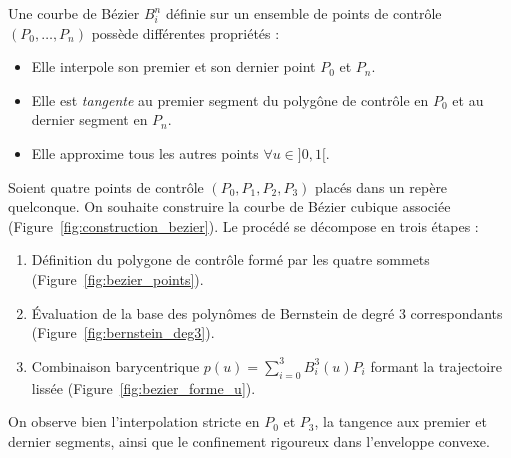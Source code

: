 \begin{prop}
    Une courbe de Bézier $B_i^n$ définie sur un ensemble de points de contrôle $(P_0, \dots, P_n)$ possède différentes propriétés : 
    \begin{itemize}
        \item Elle interpole son premier et son dernier point $P_0$ et $P_n$. 
        \item Elle est \emph{tangente} au premier segment du polygône de contrôle en $P_0$ et au dernier segment en $P_n$. 
        \item Elle approxime tous les autres points $ \forall u \in ]0, 1[$. 
    \end{itemize}
\end{prop}
\begin{example}
    Soient quatre points de contrôle $(P_0, P_1, P_2, P_3)$ placés dans un repère quelconque. On souhaite construire la courbe de Bézier cubique associée (Figure~\ref{fig:construction_bezier}). 
    Le procédé se décompose en trois étapes :
    \begin{enumerate}
        \item Définition du polygone de contrôle formé par les quatre sommets (Figure~\ref{fig:bezier_points}).
        \item Évaluation de la base des polynômes de Bernstein de degré 3 correspondants (Figure~\ref{fig:bernstein_deg3}).
        \item Combinaison barycentrique $p(u) = \sum_{i=0}^3 B_i^3(u) P_i$ formant la trajectoire lissée (Figure~\ref{fig:bezier_forme_u}).
    \end{enumerate}
    On observe bien l'interpolation stricte en $P_0$ et $P_3$, la tangence aux premier et dernier segments, ainsi que le confinement rigoureux dans l'enveloppe convexe.

    \begin{figure}[htbp]
        \centering
        \begin{subfigure}[b]{0.31\linewidth}
            \centering
\end{subfigure}
\end{figure}
\end{example}
